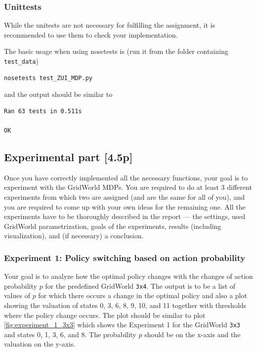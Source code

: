 \documentclass[10pt,journal,compsoc,twoside]{IEEEtran}
\begin{document}
\subsubsection{Unittests}
While the unitests are not necessary for fulfilling the assignment, it is recommended to use them to check your implementation.

The basic usage when using nosetests is (run it from the folder containing  \texttt{test\_data})

\begin{lstlisting}[language=none]
nosetests test_ZUI_MDP.py
\end{lstlisting}

and the output should be similar to
\begin{lstlisting}[language=none]
Ran 63 tests in 0.511s

OK
\end{lstlisting}

\subsection{Experimental part [4.5p]}
Once you have correctly implemented all the necessary functions, your goal is to experiment with the GridWorld MDPs. You are required to do at least 3 different experiments from which two are assigned (and are the same for all of you), and you are required to come up with your own ideas for the remaining one. All the experiments have to be thoroughly described in the report --- the settings, used GridWorld parametrization, goals of the experiments, results (including visualization), and (if necessary) a conclusion. 

\subsubsection{Experiment 1: Policy switching based on action probability}
Your goal is to analyze how the optimal policy changes with the changes of action probability $p$ for the predefined GridWorld \texttt{3x4}. The output is to be a list of values of $p$ for which there occurs a change in the optimal policy and also a plot showing the valuation of states 0, 3, 6, 8, 9, 10, and 11 together with thresholds where the policy change occurs. The plot should be similar to plot \cref{fig:experiment_1_3x3} which shows the Experiment 1 for the GridWorld \texttt{3x3} and states 0, 1, 3, 6, and 8. The probability $p$ should be on the x-axis and the valuation on the y-axis.
\end{document}
